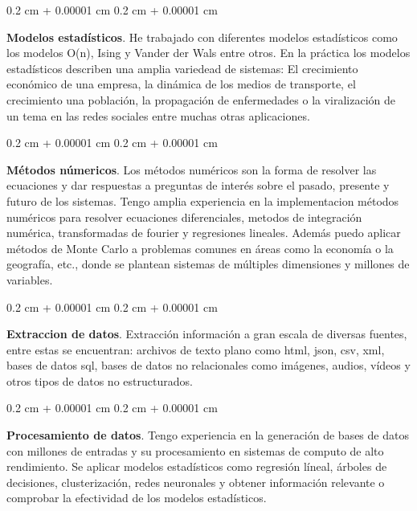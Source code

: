 \documentclass[10pt, letterpaper]{article}
\newenvironment{onecolentry}{
    \begin{adjustwidth}{
        0.2 cm + 0.00001 cm
    }{
        0.2 cm + 0.00001 cm
    }
}{
    \end{adjustwidth}
} %
\begin{document}
        \vspace{0.2 cm}
        
        \begin{onecolentry}
            \textbf{Modelos estadísticos}. He trabajado con diferentes modelos estadísticos como los modelos O(n), Ising y Vander der Wals entre otros. En la práctica los modelos estadísticos describen una amplia variedead de sistemas: El crecimiento económico de una empresa, la dinámica de los medios de transporte, el crecimiento una población,  la propagación de enfermedades o la viralización de un tema en las redes sociales entre muchas otras aplicaciones.
        \end{onecolentry}

        \vspace{0.2 cm}

        \begin{onecolentry}
            \textbf{Métodos númericos}. Los métodos numéricos son la forma de resolver las ecuaciones  y dar respuestas a preguntas de interés sobre el pasado, presente y futuro de los sistemas. Tengo  amplia experiencia en la implementacion métodos numéricos para resolver ecuaciones diferenciales, metodos de integración numérica, transformadas de fourier y regresiones lineales. Además puedo aplicar métodos de Monte Carlo a problemas comunes en áreas como la economía o la geografía, etc., donde se plantean sistemas de múltiples dimensiones y millones de variables.
        \end{onecolentry}
        \vspace{0.2 cm}

        \begin{onecolentry}
            \textbf{Extraccion de datos}. Extracción  información a gran escala de diversas fuentes, entre estas se encuentran: archivos de texto plano como html, json, csv, xml, bases de datos sql, bases de datos no relacionales como imágenes, audios, vídeos y otros tipos de datos no estructurados.
        \end{onecolentry}
    
        \vspace{0.2cm}

        \begin{onecolentry}
            \textbf{Procesamiento de datos}. Tengo experiencia en la generación de bases de datos con millones de entradas y su procesamiento en sistemas de computo de alto rendimiento. Se aplicar modelos estadísticos como regresión líneal, árboles de decisiones, clusterización, redes neuronales y obtener información relevante o comprobar la efectividad de los modelos estadísticos.
        \end{onecolentry}
\end{document}

